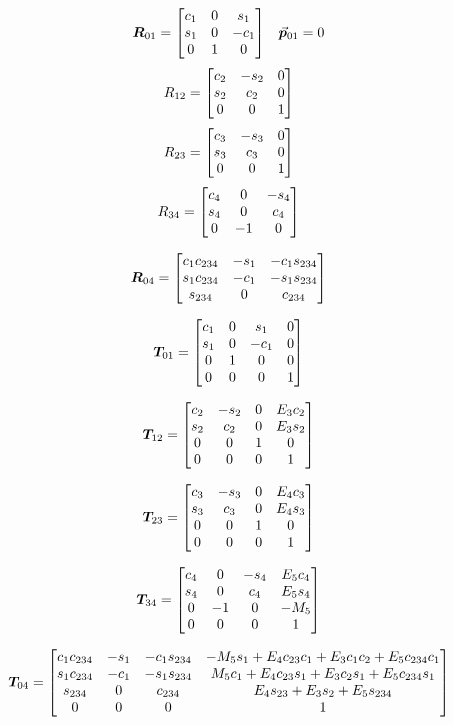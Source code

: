 \begin{align*}
\bm{R}_{01} =
\begin{bmatrix}c_1 & 0 & s_1   \\
   s_1 & 0 & -c_1  \\
   0   & 1 &    0  \\\end{bmatrix} 
& & \vec{\bm{p}}_{01} = 0
\end{align*}
\begin{align*}
R_{12} = 
\begin{bmatrix}c_2 & -s_2 &  0  \\
   s_2 &  c_2 &  0  \\
   0   &    0 &  1  \\\end{bmatrix} 
\end{align*}
\begin{align*}
R_{23} = 
\begin{bmatrix}c_3 & -s_3 &  0  \\
   s_3 &  c_3 &  0  \\
   0   &    0 &  1  \\\end{bmatrix} 
\end{align*}
\begin{align*}
R_{34} = 
\begin{bmatrix}c_4 &  0 & -s_4  \\
   s_4 &  0 &  c_4  \\
   0   & -1 &    0  \\\end{bmatrix} 
\end{align*}


\begin{equation}
\bm{R}_{04} = 
\begin{bmatrix}
	c_1 c_{234} & -s_1 & -c_1 s_{234} \\
	s_1 c_{234} & -c_1 & -s_1 s_{234} \\
		s_{234} &    0 & 	  c_{234}
\end{bmatrix}
\end{equation}


\[ \bm{T}_{01} = 
\begin{bmatrix}c_1 & 0 & s_1 &  0 \\
   s_1 & 0 & -c_1 & 0 \\
   0   & 1 &    0 & 0 \\
   0   & 0 &    0 & 1\end{bmatrix}\]

\[ \bm{T}_{12} = 
\begin{bmatrix}c_2 & -s_2 &  0 & E_3 c_2 \\
   s_2 &  c_2 &  0 & E_3 s_2  \\
   0   &    0 &  1 & 	   0  \\
   0   &    0 &  0 &       1\end{bmatrix} \]

\[ \bm{T}_{23} = 
\begin{bmatrix}c_3 & -s_3 &  0 & E_4 c_3 \\
   s_3 &  c_3 &  0 & E_4 s_3  \\
   0   &    0 &  1 & 	   0  \\
   0   &    0 &  0 &       1\end{bmatrix} \]

\[ \bm{T}_{34} = 
\begin{bmatrix}c_4 &    0 &  -s_4 & E_5 c_4 \\
   s_4 &    0 &   c_4 & E_5 s_4 \\
   0   &   -1 &     0 & 	-M_5 \\
   0   &    0 &     0 &       1\end{bmatrix} \]

\[ \bm{T}_{04} = 
\begin{bmatrix}
   c_1 c_{234} & -s_1 & -c_1 s_{234} & -M_5 s_1 + E_4 c_{23}c_1 + E_3 c_1 c_2 + E_5 c_{234} c_1 \\
   s_1 c_{234} & -c_1 & -s_1 s_{234} &   M_5 c_1+E_4 c_{23} s_1 + E_3 c_2 s_1 + E_5 c_{234} s_1 \\
   s_{234}     &    0 &      c_{234} &					     E_4 s_{23} + E_3 s_2 + E_5 s_{234} \\
   0   &    0 &     0 &      												   1
\end{bmatrix} \]